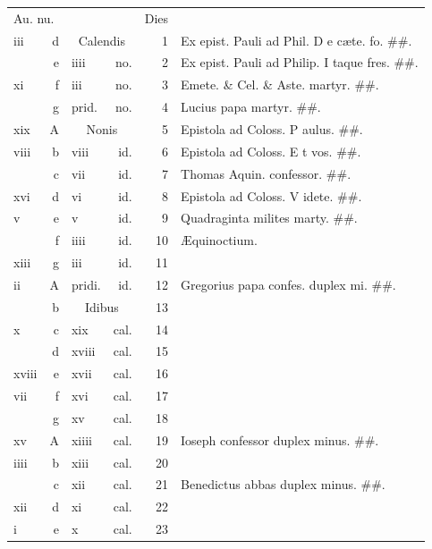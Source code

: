 \documentclass[a5paper,10pt]{book}
\def\ae{æ}
\def\AE{Æ}
\begin{document}
\begin{center}
\begin{tabular}{l r l r r l}
\multicolumn{2}{l}{\color{red}Au. nu.} & & & \color{red} Dies & \\
iii & d & \multicolumn{2}{c}{\color{red} Calendis} & 1 & Ex epist. Pauli ad Phil. \color{red} D\color{black} e c\ae te. fo. \#\#.\\%
 & e & iiii & no. & 2 & Ex epist. Pauli ad Philip. \color{red} I\color{black} taque fres. \#\#.\\%
xi & f & iii & no. & 3 & Emete. \& Cel. \& Aste. martyr. \color{black} \#\#.\\
 & g & \color{red} prid. & \color{red} no. & 4 & Lucius papa martyr. \color{black} \#\#.\\
xix & \color{red} A & \multicolumn{2}{c}{\color{red} Nonis} & 5 & Epistola ad Coloss. \color{red} P\color{black} aulus. \#\#.\\
viii & b & viii & id. & 6 & Epistola ad Coloss. \color{red} E\color{black} t vos. \#\#.\\
 & c & vii & id. & 7 & Thomas Aquin. confessor. \color{black} \#\#.\\
xvi & d & vi & id. & 8 & Epistola ad Coloss. \color{red} V\color{black} idete. \#\#.\\
v & e & v & id. & 9 & Quadraginta milites marty. \color{black} \#\#.\\
 & f & iiii & id. & 10 & \color{red} \AE quinoctium. \\%
xiii & g & iii & id. & 11 & \\%
ii & \color{red} A & \color{red} pridi. & \color{red} id. & 12 & Gregorius papa confes. duplex mi. \color{black} \#\#.\\
 & b & \multicolumn{2}{c}{\color{red} Idibus} & 13 & \\
x & c & xix & cal. & 14 & \\
 & d & xviii & cal. & 15 & \\
xviii & e & xvii & cal. & 16 & \\
vii & f & xvi & cal. & 17 & \\
 & g & xv & cal. & 18 & \\
xv & \color{red} A & xiiii & cal. & 19 & Ioseph confessor duplex minus. \#\#.\\
iiii & b & xiii & cal. & 20 & \\
 & c & xii & cal. & 21 & Benedictus abbas duplex minus. \#\#.\\
xii & d & xi & cal. & 22 & \\
i & e & x & cal. & 23 & \\

\end{tabular}
\end{center}
\end{document}
